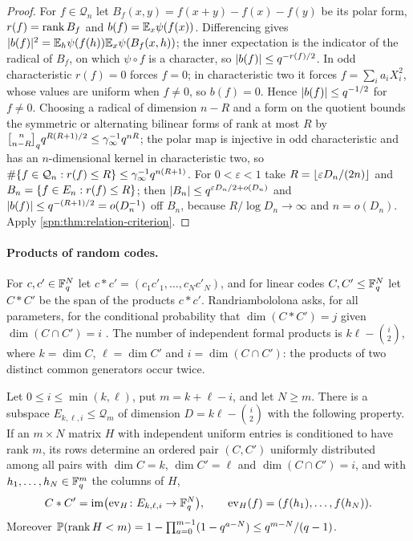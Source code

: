 \begin{proof}
For $f\in\mathcal Q_n$ let $B_f(x,y)=f(x+y)-f(x)-f(y)$ be its polar form, $r(f)=\operatorname{rank} B_f$ and
$b(f)=\mathbb{E}_x\psi(f(x))$. Differencing gives
$\lvert b(f)\rvert^2=\mathbb{E}_h\psi(f(h))\mathbb{E}_x\psi(B_f(x,h))$; the inner expectation is the indicator of the
radical of $B_f$, on which $\psi\circ f$ is a character, so $\lvert b(f)\rvert\le q^{-r(f)/2}$. In odd
characteristic $r(f)=0$ forces $f=0$; in characteristic two it forces $f=\sum_ia_iX_i^2$, whose
values are uniform when $f\ne0$, so $b(f)=0$. Hence $\lvert b(f)\rvert\le q^{-1/2}$ for $f\ne0$. Choosing a
radical of dimension $n-R$ and a form on the quotient bounds the symmetric or alternating bilinear forms
of rank at most $R$ by $\spnqbin n{n-R}{q}q^{R(R+1)/2}\le\gamma_\infty^{-1}q^{nR}$; the polar map is
injective in odd characteristic and has an $n$-dimensional kernel in characteristic two, so
$\#\{f\in\mathcal Q_n:r(f)\le R\}\le\gamma_\infty^{-1}q^{n(R+1)}$. For $0<\varepsilon<1$ take
$R=\lfloor\varepsilon D_n/(2n)\rfloor$ and $B_n=\{f\in E_n:r(f)\le R\}$; then
$\lvert B_n\rvert\le q^{\varepsilon D_n/2+o(D_n)}$ and $\lvert b(f)\rvert\le q^{-(R+1)/2}=o(D_n^{-1})$ off $B_n$,
because $R/\log D_n\to\infty$ and $n=o(D_n)$. Apply \cref{spn:thm:relation-criterion}.
\end{proof}

\paragraph{Products of random codes.}
For $c,c'\in\mathbb{F}_q^N$ let $c*c'=(c_1c'_1,\dots,c_Nc'_N)$, and for linear codes $C,C'\le\mathbb{F}_q^N$ let
$C*C'$ be the span of the products $c*c'$. Randriambololona asks, for all parameters, for the
conditional probability that $\dim(C*C')=j$ given $\dim(C\cap C')=i$
\cite[Section~6, Problem~21]{Randriambololona2015Linear}. The number of independent formal products is
$k\ell-\binom i2$, where $k=\dim C$, $\ell=\dim C'$ and $i=\dim(C\cap C')$: the products of two
distinct common generators occur twice.

\begin{proposition}\label{spn:prop:code-coordinates}
Let $0\le i\le\min(k,\ell)$, put $m=k+\ell-i$, and let $N\ge m$. There is a subspace
$E_{k,\ell,i}\le\mathcal Q_m$ of dimension $D=k\ell-\binom i2$ with the following property. If an
$m\times N$ matrix $H$ with independent uniform entries is conditioned to have rank $m$, its rows
determine an ordered pair $(C,C')$ uniformly distributed among all pairs with $\dim C=k$,
$\dim C'=\ell$ and $\dim(C\cap C')=i$, and with $h_1,\dots,h_N\in\mathbb{F}_q^m$ the columns of $H$,
\[
 C*C'=\operatorname{im}\bigl(\mathrm{ev}_H\colon E_{k,\ell,i}\to\mathbb{F}_q^N\bigr),\qquad
 \mathrm{ev}_H(f)=(f(h_1),\dots,f(h_N)).
\]
Moreover $\mathbb{P}(\operatorname{rank} H<m)=1-\prod_{a=0}^{m-1}(1-q^{a-N})\le q^{m-N}/(q-1)$.
\end{proposition}

